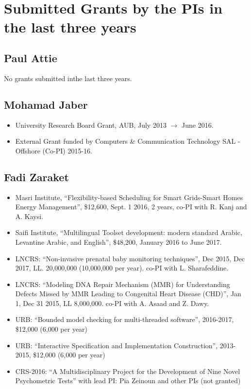 \section{Submitted Grants by the PIs in the last three years}

\subsection{Paul Attie}

No grants submitted inthe last three years.



\subsection{Mohamad Jaber}
\begin{itemize}
\item{University Research Board Grant, AUB, July 2013 $\rightarrow$ June 2016.}
\item{External Grant funded by Computers \& Communication Technology SAL - Offshore (Co-PI) 2015-16.}
\end{itemize}


\subsection{Fadi Zaraket}

\begin{itemize}
\item Masri Institute, ``Flexibility-based Scheduling for Smart Grids-Smart Homes Energy Management'', 
  \$12,600, Sept. 1 2016, 2 years, co-PI with R. Kanj and A. Kaysi. 

\item Saifi Institute, ``Multilingual Toolset development: modern standard Arabic, Levantine Arabic, and English'', 
  \$48,200, January 2016 to June 2017. 

\item LNCRS: ``Non-invasive prenatal baby monitoring techniques'', 
  Dec 2015, Dec 2017, LL. 20,000,000 (10,000,000 per year). co-PI with L. Sharafeddine. 

\item LNCRS: ``Modeling DNA Repair Mechanism (MMR) for Understanding Defects Missed by MMR Leading to  Congenital Heart Disease (CHD)'',
    Jan 1, Dec 31 2015, LL 8,000,000.  co-PI with A. Asaad and Z. Dawy. 

\item URB: ``Bounded model checking for multi-threaded software'', 2016-2017, \$12,000 (6,000 per year) 

\item URB: ``Interactive Specification and Implementation Construction'', 2013-2015, \$12,000 (6,000 per year) 

\item CRS-2016: ``A Multidisciplinary Project for the Development of Nine Novel Psychometric Tests'' with lead PI: Pia Zeinoun and other PIs (not granted) 
\end{itemize}

